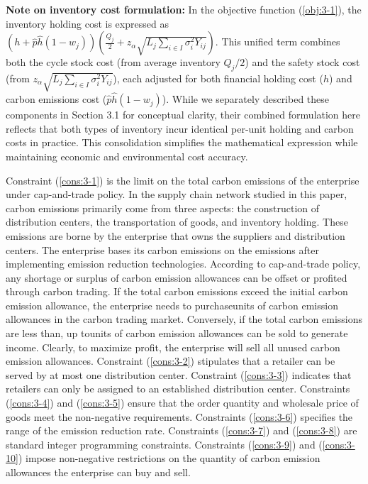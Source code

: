 \documentclass[]{article}
\theoremstyle{plain}%
\theoremstyle{definition}
\theoremstyle{remark}
\theoremstyle{plain}%
\begin{document}
    \textbf{Note on inventory cost formulation:} In the objective function (\ref{obj:3-1}), the inventory holding cost is expressed as $(h+\hat{p}\hat{h}(1-w_j))\left(\frac{Q_j}{2}+z_{\alpha} \sqrt{L_j\sum_{i\in I}\sigma^2_iY_{ij}}\right)$. This unified term combines both the cycle stock cost (from average inventory $Q_j/2$) and the safety stock cost (from $z_{\alpha} \sqrt{L_j\sum_{i\in I}\sigma^2_iY_{ij}}$), each adjusted for both financial holding cost ($h$) and carbon emissions cost ($\hat{p}\hat{h}(1-w_j)$). While we separately described these components in Section 3.1 for conceptual clarity, their combined formulation here reflects that both types of inventory incur identical per-unit holding and carbon costs in practice. This consolidation simplifies the mathematical expression while maintaining economic and environmental cost accuracy.
    
     Constraint (\ref{cons:3-1}) is the limit on the total carbon emissions of the enterprise under cap-and-trade policy. In the supply chain network studied in this paper, carbon emissions primarily come from three aspects: the construction of distribution centers, the transportation of goods, and inventory holding. These emissions are borne by the enterprise that owns the suppliers and distribution centers. The enterprise bases its carbon emissions on the emissions after implementing emission reduction technologies. According to cap-and-trade policy, any shortage or surplus of carbon emission allowances can be offset or profited through carbon trading. If the total carbon emissions exceed the initial carbon emission allowance, the enterprise needs to purchaseunits of carbon emission allowances in the carbon trading market. Conversely, if the total carbon emissions are less than, up tounits of carbon emission allowances can be sold to generate income. Clearly, to maximize profit, the enterprise will sell all unused carbon emission allowances.
     Constraint (\ref{cons:3-2}) stipulates that a retailer can be served by at most one distribution center. Constraint (\ref{cons:3-3}) indicates that retailers can only be assigned to an established distribution center. Constraints (\ref{cons:3-4}) and (\ref{cons:3-5}) ensure that the order quantity and wholesale price of goods meet the non-negative requirements. Constraints (\ref{cons:3-6}) specifies the range of the emission reduction rate. Constraints (\ref{cons:3-7}) and (\ref{cons:3-8}) are standard integer programming constraints. Constraints (\ref{cons:3-9}) and (\ref{cons:3-10}) impose non-negative restrictions on the quantity of carbon emission allowances the enterprise can buy and sell.
    
\end{document}
